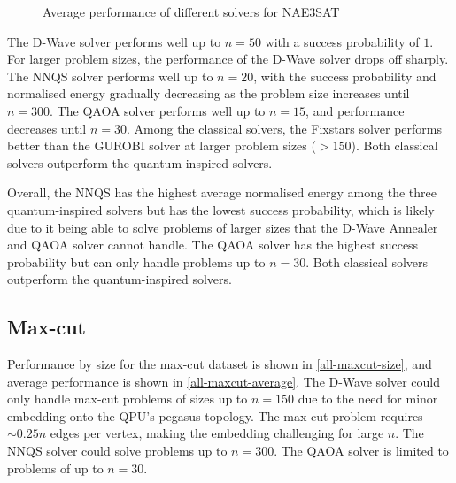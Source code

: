\begin{figure}[!htb]
    \centering
    \hspace{30pt}
    \caption{Average performance of different solvers for NAE3SAT}
    \label{all-nae3sat-average}
\end{figure}

The D-Wave solver performs well up to $n=50$ with a success probability of $1$. For larger problem sizes, the performance of the D-Wave solver drops off sharply. The NNQS solver performs well up to $n=20$, with the success probability and normalised energy gradually decreasing as the problem size increases until $n=300$. The QAOA solver performs well up to $n=15$, and performance decreases until $n=30$. Among the classical solvers, the Fixstars solver performs better than the GUROBI solver at larger problem sizes ($>150$). Both classical solvers outperform the quantum-inspired solvers.

Overall, the NNQS has the highest average normalised energy among the three quantum-inspired solvers but has the lowest success probability, which is likely due to it being able to solve problems of larger sizes that the D-Wave Annealer and QAOA solver cannot handle. The QAOA solver has the highest success probability but can only handle problems up to $n=30$. Both classical solvers outperform the quantum-inspired solvers.

\subsection{Max-cut}
Performance by size for the max-cut dataset is shown in \autoref{all-maxcut-size}, and average performance is shown in \autoref{all-maxcut-average}. The D-Wave solver could only handle max-cut problems of sizes up to $n=150$ due to the need for minor embedding onto the QPU's pegasus topology. The max-cut problem requires $\sim 0.25n$ edges per vertex, making the embedding challenging for large $n$. The NNQS solver could solve problems up to $n=300$. The QAOA solver is limited to problems of up to $n=30$.

